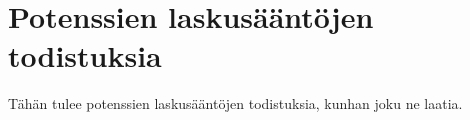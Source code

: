 \chapter{Potenssien laskusääntöjen todistuksia}
\label{pot_todistukset}

Tähän tulee potenssien laskusääntöjen todistuksia, kunhan joku ne laatia.